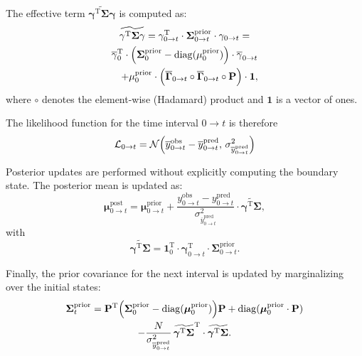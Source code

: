 \documentclass[9pt]{elife}
\begin{document}
	The effective term \( \widetilde{\mathbf{\gamma}^{\mathrm{T}} \mathbf{\Sigma}\mathbf{\gamma}} \) is computed as:
	\begin{multline}
		\widetilde{\mathbf{\gamma}^{\mathrm{T}} \mathbf{\Sigma}\mathbf{\gamma}} = \mathbf{\gamma}^{\mathrm{T}}_{0 \rightarrow t} \cdot \mathbf{\Sigma}^{\text{prior}}_{0 \rightarrow t} \cdot \mathbf{\gamma}_{0 \rightarrow t} = \\
		\overline{\mathbf{\gamma}}_{0}^{\mathrm{T}} \cdot \Bigl( \mathbf{\Sigma}^{\text{prior}}_{0} - \mathrm{diag}(\mathbf{\mu}^{\text{prior}}_0) \Bigr) \cdot \overline{\mathbf{\gamma}}_{0 \rightarrow t} \\
		\quad + \mathbf{\mu}^{\text{prior}}_0 \cdot \Bigl( \overline{\mathbf{\Gamma}}_{0 \rightarrow t} \circ \overline{\mathbf{\Gamma}}_{0 \rightarrow t} \circ \mathbf{P} \Bigr) \cdot \mathbf{1},
		\label{eq:simplified_boundary_state}
	\end{multline}
	where \( \circ \) denotes the element-wise (Hadamard) product and \( \mathbf{1} \) is a vector of ones.
	
	The likelihood function for the time interval $0 \rightarrow t$ is therefore
	\begin{equation}
		\mathcal{L}_{0 \rightarrow t} = \mathcal{N}\Bigl( \overline{y}^{\text{obs}}_{0 \rightarrow t} - \overline{y}^{\text{pred}}_{0 \rightarrow t},\, \sigma^2_{\overline{y}^{\text{pred}}_{0 \rightarrow t}} \Bigr)
		\label{eq:macroIR_likelihood}
	\end{equation}
	
	Posterior updates are performed without explicitly computing the boundary state. The posterior mean is updated as:
	\begin{equation}
		\mathbf{\mu}^{\text{post}}_{0 \rightarrow t} = \mathbf{\mu}^{\text{prior}}_{0 \rightarrow t} + \frac{y^{\text{obs}}_{0 \rightarrow t} - y^{\text{pred}}_{0 \rightarrow t}}{\sigma^2_{\overline{y}^{\text{pred}}_{0 \rightarrow t}}} \cdot \widetilde{\boldsymbol{\gamma}^{\mathrm{T}} \boldsymbol{\Sigma}},
		\label{eq:macro_interval_posterior_mean}
	\end{equation}
	with
	\begin{equation}
		\widetilde{\boldsymbol{\gamma}^{\mathrm{T}} \boldsymbol{\Sigma}} = \mathbf{1}_0^{\mathrm{T}} \cdot \mathbf{\gamma}^{\mathrm{T}}_{0 \rightarrow t} \cdot \mathbf{\Sigma}^{\text{prior}}_{0 \rightarrow t}.
		\label{eq:interval_gamma_sigma}
	\end{equation}
	
	Finally, the prior covariance for the next interval is updated by marginalizing over the initial states:
	\begin{multline}
		\boldsymbol{\Sigma}^{\text{prior}}_{t} = \mathbf{P}^{\mathrm{T}} \Bigl( \boldsymbol{\Sigma}^{\text{prior}}_{0} - \mathrm{diag}(\boldsymbol{\mu}^{\text{prior}}_{0}) \Bigr) \mathbf{P} + \mathrm{diag}(\boldsymbol{\mu}^{\text{prior}}_{0} \cdot \mathbf{P}) \\
		- \frac{N}{\sigma^2_{\overline{y}^{\text{pred}}_{0 \rightarrow t}}} \, \widetilde{\boldsymbol{\gamma}^{\mathrm{T}} \boldsymbol{\Sigma}}^{\mathrm{T}} \cdot \widetilde{\boldsymbol{\gamma}^{\mathrm{T}} \boldsymbol{\Sigma}}.
		\label{eq:prior_covariance_update_0_t}
	\end{multline}
	
\end{document}

